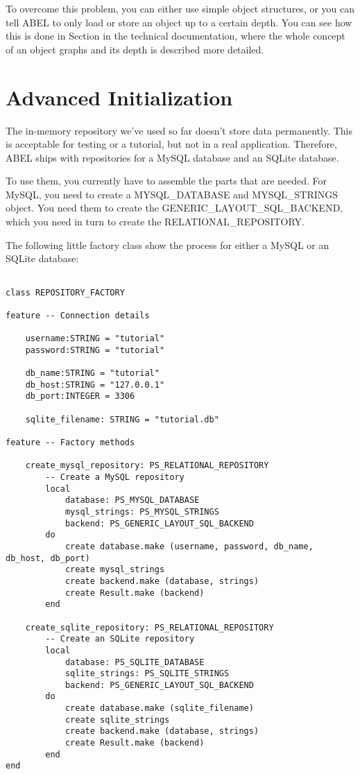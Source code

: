 To overcome this problem, you can either use simple object structures, or you can tell ABEL to only load or store an object up to a certain depth.
You can see how this is done in Section  in the technical documentation, where the whole concept of an object graphs and its depth is described more detailed.



\section{Advanced Initialization}
\label{section:advanced_initialization}

The in-memory repository we've used so far doesn't store data permanently.
This is acceptable for testing or a tutorial, but not in a real application.
Therefore, ABEL ships with repositories for a MySQL database and an SQLite database.

To use them, you currently have to assemble the parts that are needed.
For MySQL, you need to create a MYSQL\_DATABASE and MYSQL\_STRINGS object.
You need them to create the GENERIC\_LAYOUT\_SQL\_BACKEND, which you need in turn to create the RELATIONAL\_REPOSITORY.

The following little factory class show the process for either a MySQL or an SQLite database:

\begin{lstlisting}[language=OOSC2Eiffel, captionpos=b, caption={}, label={lst:advanced_initialization}]

class REPOSITORY_FACTORY

feature -- Connection details
	
	username:STRING = "tutorial"
	password:STRING = "tutorial"

	db_name:STRING = "tutorial"
	db_host:STRING = "127.0.0.1"
	db_port:INTEGER = 3306

	sqlite_filename: STRING = "tutorial.db"

feature -- Factory methods

	create_mysql_repository: PS_RELATIONAL_REPOSITORY
		-- Create a MySQL repository
		local
			database: PS_MYSQL_DATABASE
			mysql_strings: PS_MYSQL_STRINGS
			backend: PS_GENERIC_LAYOUT_SQL_BACKEND
		do
			create database.make (username, password, db_name, db_host, db_port)
			create mysql_strings
			create backend.make (database, strings)
			create Result.make (backend)
		end

	create_sqlite_repository: PS_RELATIONAL_REPOSITORY
		-- Create an SQLite repository
		local
			database: PS_SQLITE_DATABASE
			sqlite_strings: PS_SQLITE_STRINGS
			backend: PS_GENERIC_LAYOUT_SQL_BACKEND
		do
			create database.make (sqlite_filename)
			create sqlite_strings
			create backend.make (database, strings)
			create Result.make (backend)
		end
end	

\end{lstlisting}


